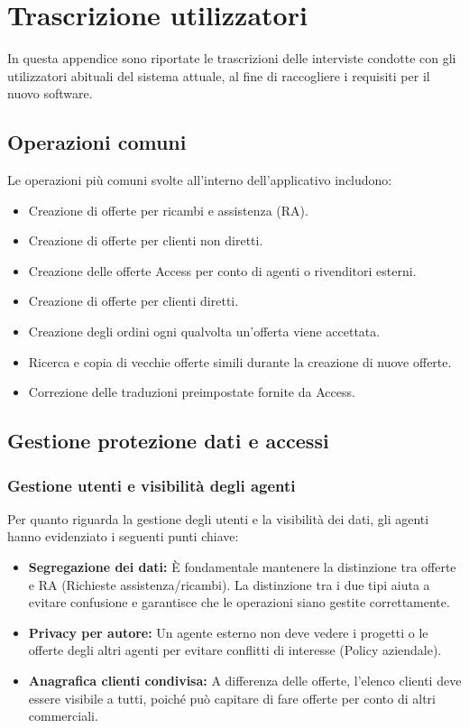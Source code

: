 \chapter{Trascrizione utilizzatori}\label{app:risultati-interviste-utilizzatori}
In questa appendice sono riportate le trascrizioni delle interviste condotte con gli utilizzatori abituali
del sistema attuale, al fine di raccogliere i requisiti per il nuovo software.

\section{Operazioni comuni}
Le operazioni più comuni svolte all'interno dell'applicativo includono:
\begin{itemize}
      \item Creazione di offerte per ricambi e assistenza (\ac{RA}).
      \item Creazione di offerte per clienti non diretti.
      \item Creazione delle offerte Access per conto di agenti o rivenditori esterni.
      \item Creazione di offerte per clienti diretti.
      \item Creazione degli ordini ogni qualvolta un'offerta viene accettata.
      \item Ricerca e copia di vecchie offerte simili durante la creazione di nuove offerte.
      \item Correzione delle traduzioni preimpostate fornite da Access.
\end{itemize}

\section{Gestione protezione dati e accessi}
\subsection{Gestione utenti e visibilità degli agenti}
Per quanto riguarda la gestione degli utenti e la visibilità dei dati, gli agenti
hanno evidenziato i seguenti punti chiave:
\begin{itemize}
      \item \textbf{Segregazione dei dati:} È fondamentale mantenere la distinzione tra offerte e
            \ac{RA} (Richieste assistenza/ricambi).
            La distinzione tra i due tipi aiuta a evitare confusione e garantisce che le operazioni
            siano gestite correttamente.
      \item \textbf{Privacy per autore:} Un agente esterno non deve vedere i progetti o le offerte
            degli altri agenti per evitare conflitti di interesse (Policy aziendale).
      \item \textbf{Anagrafica clienti condivisa:} A differenza delle offerte, l'elenco clienti deve
            essere visibile a tutti, poiché può capitare di fare offerte per conto di altri commerciali.
\end{itemize}

